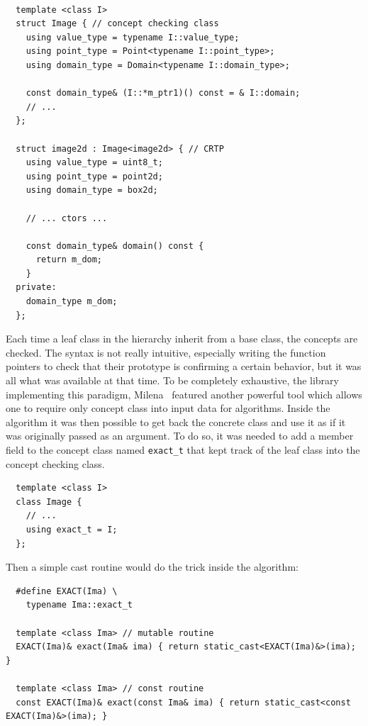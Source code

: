 \begin{verbatim}

  template <class I>
  struct Image { // concept checking class
    using value_type = typename I::value_type;
    using point_type = Point<typename I::point_type>;
    using domain_type = Domain<typename I::domain_type>;

    const domain_type& (I::*m_ptr1)() const = & I::domain;
    // ...
  };

  struct image2d : Image<image2d> { // CRTP
    using value_type = uint8_t;
    using point_type = point2d;
    using domain_type = box2d;

    // ... ctors ...

    const domain_type& domain() const {
      return m_dom;
    }
  private:
    domain_type m_dom;
  };
\end{verbatim}

Each time a leaf class in the hierarchy inherit from a base class, the concepts are checked. The syntax is not really
intuitive, especially writing the function pointers to check that their prototype is confirming a certain behavior, but
it was all what was available at that time. To be completely exhaustive, the library implementing this paradigm,
Milena~\parencite{levillain.2010.icip, levillain.2009.ismm} featured another powerful tool which allows one to require
only concept class into input data for algorithms. Inside the algorithm it was then possible to get back the concrete
class and use it as if it was originally passed as an argument. To do so, it was needed to add a member field to the
concept class named \texttt{exact\_t} that kept track of the leaf class into the concept checking class.

\begin{verbatim}
  template <class I>
  class Image {
    // ...
    using exact_t = I;
  };
\end{verbatim}

Then a simple cast routine would do the trick inside the algorithm:

\begin{verbatim}
  #define EXACT(Ima) \
    typename Ima::exact_t
    
  template <class Ima> // mutable routine
  EXACT(Ima)& exact(Ima& ima) { return static_cast<EXACT(Ima)&>(ima); }

  template <class Ima> // const routine
  const EXACT(Ima)& exact(const Ima& ima) { return static_cast<const EXACT(Ima)&>(ima); }
\end{verbatim}

